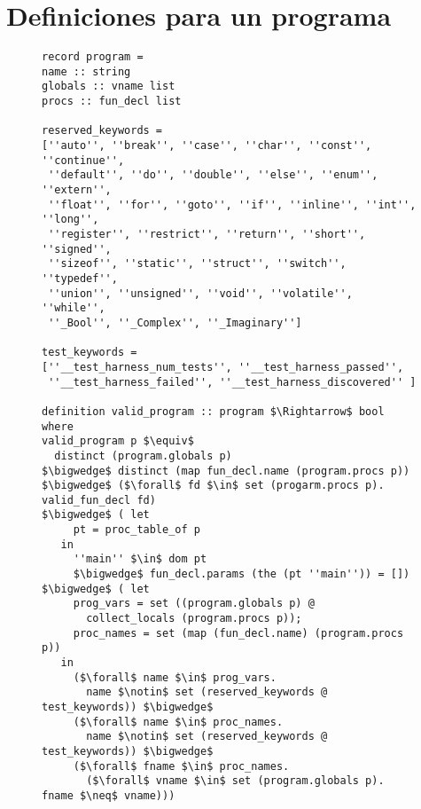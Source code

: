 \chapter{Definiciones para un programa}
\label{ap:prog_def}

\begin{figure}
\begin{lstlisting}[frame=single, mathescape=true]
record program =
name :: string
globals :: vname list
procs :: fun_decl list

reserved_keywords =
[''auto'', ''break'', ''case'', ''char'', ''const'', ''continue'',
 ''default'', ''do'', ''double'', ''else'', ''enum'', ''extern'',
 ''float'', ''for'', ''goto'', ''if'', ''inline'', ''int'', ''long'',
 ''register'', ''restrict'', ''return'', ''short'', ''signed'',
 ''sizeof'', ''static'', ''struct'', ''switch'', ''typedef'',
 ''union'', ''unsigned'', ''void'', ''volatile'', ''while'',
 ''_Bool'', ''_Complex'', ''_Imaginary'']

test_keywords =
[''__test_harness_num_tests'', ''__test_harness_passed'',
 ''__test_harness_failed'', ''__test_harness_discovered'' ]

definition valid_program :: program $\Rightarrow$ bool where
valid_program p $\equiv$
  distinct (program.globals p)
$\bigwedge$ distinct (map fun_decl.name (program.procs p))
$\bigwedge$ ($\forall$ fd $\in$ set (progarm.procs p). valid_fun_decl fd)
$\bigwedge$ ( let
     pt = proc_table_of p
   in
     ''main'' $\in$ dom pt
     $\bigwedge$ fun_decl.params (the (pt ''main'')) = [])
$\bigwedge$ ( let
     prog_vars = set ((program.globals p) @
       collect_locals (program.procs p));
     proc_names = set (map (fun_decl.name) (program.procs p))
   in
     ($\forall$ name $\in$ prog_vars.
       name $\notin$ set (reserved_keywords @ test_keywords)) $\bigwedge$
     ($\forall$ name $\in$ proc_names.
       name $\notin$ set (reserved_keywords @ test_keywords)) $\bigwedge$
     ($\forall$ fname $\in$ proc_names.
       ($\forall$ vname $\in$ set (program.globals p). fname $\neq$ vname)))
\end{lstlisting}
\end{figure}
